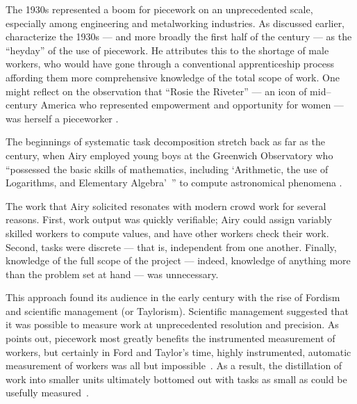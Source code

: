 \documentclass[trackingWork]{subfiles}
\begin{document}
The 1930s represented a boom for piecework on an unprecedented scale,
especially among engineering and metalworking industries.
As discussed earlier, \citeauthor{hart2013rise} characterize the 1930s
--- and more broadly the first half of the  century ---
as the ``heyday'' of the use of piecework.
He attributes this to the shortage of male workers,
who would have gone through a conventional apprenticeship process
affording them more comprehensive knowledge of the total scope of work.
One might reflect on the observation that ``Rosie the Riveter''
--- an icon of mid-- century America who represented empowerment and opportunity for women \cite{honey1985creating} ---
was herself a pieceworker
\cite{davies2014origins}.



The beginnings of
systematic task decomposition
stretch back as far as the  century,
when Airy employed young boys at the Greenwich Observatory who
``possessed the basic skills of mathematics, including
`Arithmetic, the use of Logarithms, and Elementary Algebra'~''
to compute astronomical phenomena
\cite{grier2013computers}.

The work that Airy solicited resonates with modern crowd work for several reasons.
First, work output was quickly verifiable;
Airy could assign variably skilled workers to compute values,
and have other workers check their work.
Second, tasks were discrete --- that is, independent from one another.
Finally, knowledge of the full scope of the project
--- indeed, knowledge of anything more than the problem set at hand ---
was unnecessary.

This approach found its audience in the early  century with the rise of Fordism and scientific management (or Taylorism).
Scientific management suggested that it was possible to measure work  at unprecedented resolution and precision.
As \citeauthor{Brown01041990} points out, piecework most greatly benefits the instrumented measurement of workers, but certainly in Ford and Taylor's time, highly instrumented, automatic measurement of workers was all but impossible~\cite{Brown01041990}.
As a result, the distillation of work into smaller units ultimately bottomed out with tasks as small as could be usefully measured~\cite{10.2307/23702539}.
\end{document}
